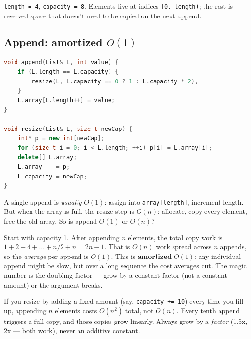 \documentclass[11pt]{article}
\begin{document}
\noindent \texttt{length = 4}, \texttt{capacity = 8}. Elements
live at indices \texttt{[0..length)}; the rest is reserved space
that doesn't need to be copied on the next append.

\subsection*{Append: amortized $O(1)$}

\begin{examplebox}
\begin{lstlisting}[language=C++,basicstyle=\ttfamily\small,frame=single]
void append(List& L, int value) {
    if (L.length == L.capacity) {
        resize(L, L.capacity == 0 ? 1 : L.capacity * 2);
    }
    L.array[L.length++] = value;
}

void resize(List& L, size_t newCap) {
    int* p = new int[newCap];
    for (size_t i = 0; i < L.length; ++i) p[i] = L.array[i];
    delete[] L.array;
    L.array    = p;
    L.capacity = newCap;
}
\end{lstlisting}
\end{examplebox}

A single append is \emph{usually} $O(1)$: assign into
\texttt{array[length]}, increment length. But when the array is
full, the resize step is $O(n)$: allocate, copy every element,
free the old array. So is append $O(1)$ or $O(n)$?

\begin{ideabox}
Start with capacity 1. After appending $n$ elements, the total
copy work is $1 + 2 + 4 + \ldots + n/2 + n = 2n - 1$. That is
$O(n)$ work spread across $n$ appends, so the \emph{average} per
append is $O(1)$. This is \textbf{amortized} $O(1)$: any
individual append might be slow, but over a long sequence the
cost averages out. The magic number is the doubling factor ---
grow by a constant factor (not a constant amount) or the
argument breaks.
\end{ideabox}

\begin{warnbox}
If you resize by adding a fixed amount (say, \texttt{capacity += 10})
every time you fill up, appending $n$ elements costs
$O(n^2)$ total, not $O(n)$. Every tenth append triggers a full
copy, and those copies grow linearly. Always grow by a \emph{factor}
(1.5x, 2x --- both work), never an additive constant.
\end{warnbox}
\end{document}
